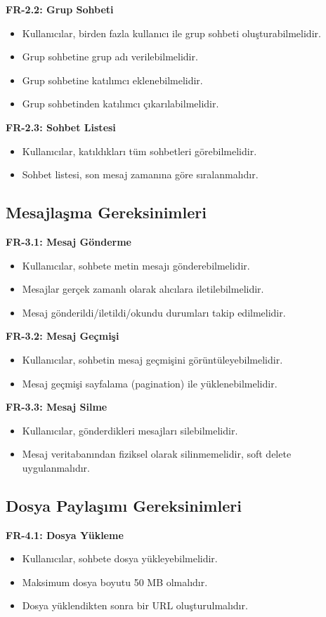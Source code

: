 \textbf{FR-2.2: Grup Sohbeti}
\begin{itemize}
    \item Kullanıcılar, birden fazla kullanıcı ile grup sohbeti oluşturabilmelidir.
    \item Grup sohbetine grup adı verilebilmelidir.
    \item Grup sohbetine katılımcı eklenebilmelidir.
    \item Grup sohbetinden katılımcı çıkarılabilmelidir.
\end{itemize}

\textbf{FR-2.3: Sohbet Listesi}
\begin{itemize}
    \item Kullanıcılar, katıldıkları tüm sohbetleri görebilmelidir.
    \item Sohbet listesi, son mesaj zamanına göre sıralanmalıdır.
\end{itemize}

\subsection{Mesajlaşma Gereksinimleri}
\textbf{FR-3.1: Mesaj Gönderme}
\begin{itemize}
    \item Kullanıcılar, sohbete metin mesajı gönderebilmelidir.
    \item Mesajlar gerçek zamanlı olarak alıcılara iletilebilmelidir.
    \item Mesaj gönderildi/iletildi/okundu durumları takip edilmelidir.
\end{itemize}

\textbf{FR-3.2: Mesaj Geçmişi}
\begin{itemize}
    \item Kullanıcılar, sohbetin mesaj geçmişini görüntüleyebilmelidir.
    \item Mesaj geçmişi sayfalama (pagination) ile yüklenebilmelidir.
\end{itemize}

\textbf{FR-3.3: Mesaj Silme}
\begin{itemize}
    \item Kullanıcılar, gönderdikleri mesajları silebilmelidir.
    \item Mesaj veritabanından fiziksel olarak silinmemelidir, soft delete uygulanmalıdır.
\end{itemize}

\subsection{Dosya Paylaşımı Gereksinimleri}
\textbf{FR-4.1: Dosya Yükleme}
\begin{itemize}
    \item Kullanıcılar, sohbete dosya yükleyebilmelidir.
    \item Maksimum dosya boyutu 50 MB olmalıdır.
    \item Dosya yüklendikten sonra bir URL oluşturulmalıdır.
\end{itemize}

